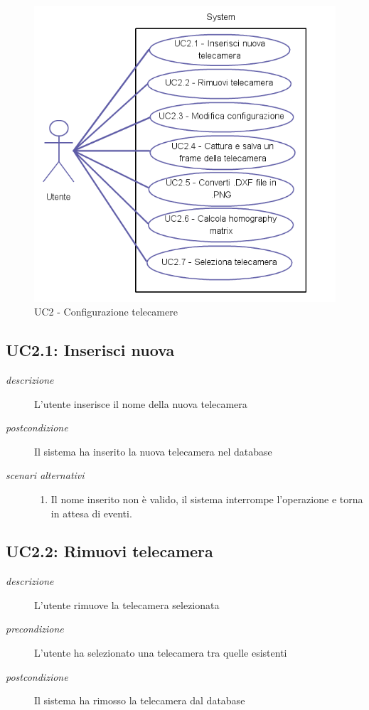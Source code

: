 \begin{figure}[htpb] 
\centering 
\includegraphics[scale=0.4]{./images/uc2.png} 
\caption{UC2 - Configurazione telecamere} 
\label{fig:UC2}
\end{figure} 

\subsection{UC2.1: Inserisci nuova} \label{sec:UC2.1}
\begin{description}
\item[\em{descrizione }]L'utente inserisce il nome della nuova telecamera
\item[\em{postcondizione }] Il sistema ha inserito la nuova telecamera nel database
\item[\em{scenari alternativi }] \mbox{} 
\begin{enumerate} 
\item Il nome inserito non è valido, il sistema interrompe l'operazione e torna in attesa di eventi.
\end{enumerate}
\end{description}

\subsection{UC2.2: Rimuovi telecamera} \label{sec:UC2.2}
\begin{description}
\item[\em{descrizione }]L'utente rimuove la telecamera selezionata
\item[\em{precondizione }] L'utente ha selezionato una telecamera tra quelle esistenti
\item[\em{postcondizione }] Il sistema ha rimosso la telecamera dal database
\end{description}


